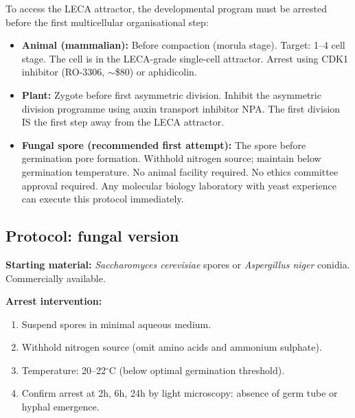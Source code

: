 \documentclass[12pt, a4paper]{article}
\theoremstyle{definition}
\theoremstyle{remark}
\begin{document}
To access the LECA attractor, the developmental program must
be arrested before the first multicellular organisational
step:

\begin{itemize}
  \item \textbf{Animal (mammalian):} Before compaction
    (morula stage). Target: 1--4 cell stage. The cell is in
    the LECA-grade single-cell attractor. Arrest using CDK1
    inhibitor (RO-3306, $\sim$\$80) or aphidicolin.

  \item \textbf{Plant:} Zygote before first asymmetric
    division. Inhibit the asymmetric division programme
    using auxin transport inhibitor NPA. The first division
    IS the first step away from the LECA attractor.

  \item \textbf{Fungal spore (recommended first attempt):}
    The spore before germination pore formation. Withhold
    nitrogen source; maintain below germination temperature.
    No animal facility required. No ethics committee approval
    required. Any molecular biology laboratory with yeast
    experience can execute this protocol immediately.
\end{itemize}

\subsection{Protocol: fungal version}

\textbf{Starting material:}
\textit{Saccharomyces cerevisiae} spores or
\textit{Aspergillus niger} conidia. Commercially available.

\textbf{Arrest intervention:}
\begin{enumerate}[label=\arabic*.]
  \item Suspend spores in minimal aqueous medium.
  \item Withhold nitrogen source (omit amino acids and
        ammonium sulphate).
  \item Temperature: 20--22$^\circ$C (below optimal
        germination threshold).
  \item Confirm arrest at 2h, 6h, 24h by light microscopy:
        absence of germ tube or hyphal emergence.
\end{enumerate}
\end{document}
